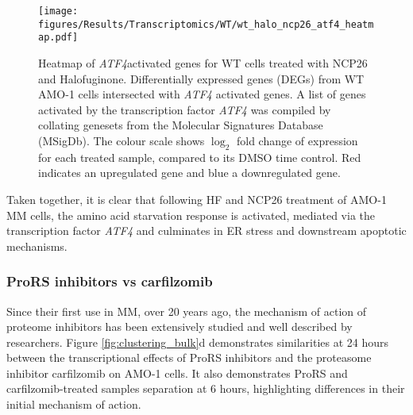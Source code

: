 \begin{figure}[hptb]
\centering
\texttt{[image: figures/Results/Transcriptomics/WT/wt\_halo\_ncp26\_atf4\_heatmap.pdf]}
\caption[Heatmap of \textit{ATF4} activated genes for ProRS treated WT cells]{Heatmap of \textit{ATF4}activated genes for WT cells treated with NCP26 and Halofuginone.
Differentially expressed genes (DEGs) from WT AMO-1 cells intersected with \textit{ATF4} activated genes.
A list of genes activated by the transcription factor \textit{ATF4} was compiled by collating genesets from the Molecular Signatures Database (MSigDb).
The colour scale shows $\log_{2}$ fold change of expression for each treated sample, compared to its DMSO time control.
Red indicates an upregulated gene and blue a downregulated gene.
}
\label{fig:wt_atf4_heatmap}
\end{figure}

Taken together, it is clear that following HF and NCP26 treatment of AMO-1 MM cells, the amino acid starvation response is activated, mediated via the transcription factor \textit{ATF4} and culminates in ER stress and downstream apoptotic mechanisms.

\subsubsection{ProRS inhibitors vs carfilzomib}
Since their first use in MM, over 20 years ago, the mechanism of action of proteome inhibitors has been extensively studied and well described by researchers\cite{nunes2017proteasome}.
Figure \ref{fig:clustering_bulk}d demonstrates similarities at 24 hours between the transcriptional effects of ProRS inhibitors and the proteasome inhibitor carfilzomib on AMO-1 cells.
It also demonstrates ProRS and carfilzomib-treated samples separation at 6 hours, highlighting differences in their initial mechanism of action.

